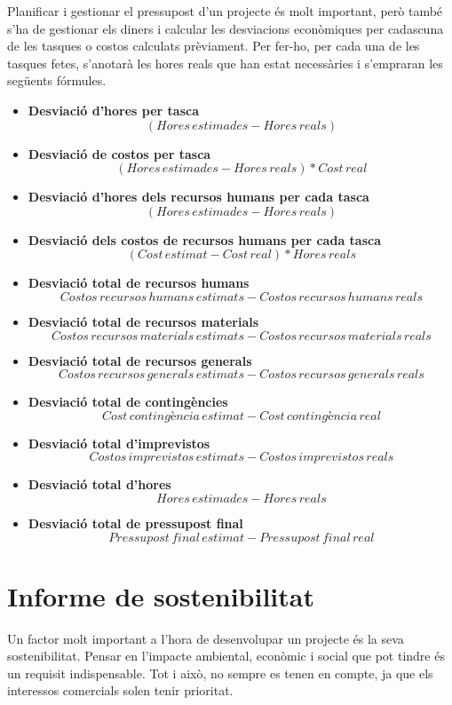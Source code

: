 \documentclass[a4paper]{article}
\begin{document}
Planificar i gestionar el pressupost d'un projecte és molt important, però també s'ha de gestionar els diners i calcular les desviacions econòmiques per cadascuna de les tasques o costos calculats prèviament. Per fer-ho, per cada una de les tasques fetes, s'anotarà les hores reals que han estat necessàries i s'empraran les següents fórmules.
\begin{itemize}
    \item \textbf{Desviació d'hores per tasca}
    \[(Hores\,estimades - Hores\,reals)\]
    \item \textbf{Desviació de costos per tasca}
    \[(Hores\,estimades - Hores\,reals) * Cost\,real\]
    \item \textbf{Desviació d'hores dels recursos humans per cada tasca}
    \[(Hores\,estimades - Hores\,reals)\]
    \item \textbf{Desviació dels costos de recursos humans per cada tasca}
    \[(Cost\, estimat - Cost\,real) * Hores\,reals\]
    \item \textbf{Desviació total de recursos humans}
    \[Costos\,recursos\,humans\,estimats - Costos\,recursos\,humans\,reals\]
    \item \textbf{Desviació total de recursos materials}
    \[Costos\,recursos\,materials\,estimats - Costos\,recursos\,materials\,reals\]
    \item \textbf{Desviació total de recursos generals}
    \[Costos\,recursos\,generals\,estimats - Costos\,recursos\,generals\,reals\]
    \item \textbf{Desviació total de contingències}
    \[Cost\,contingència\,estimat - Cost\,contingència\,real\]
    \item \textbf{Desviació total d'imprevistos}
    \[Costos\,imprevistos\,estimats - Costos\,imprevistos\,reals\]
    \item \textbf{Desviació total d'hores}
    \[Hores\,estimades - Hores\,reals\]
    \item \textbf{Desviació total de pressupost final}
    \[Pressupost\,final\,estimat - Pressupost\,final\,real\]
\end{itemize}

\newpage
\section{Informe de sostenibilitat}
Un factor molt important a l'hora de desenvolupar un projecte és la seva sostenibilitat. Pensar en l'impacte ambiental, econòmic i social que pot tindre és un requisit indispensable. Tot i això, no sempre es tenen en compte, ja que els interessos comercials solen tenir prioritat. 
\end{document}
